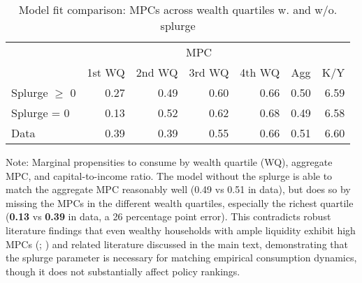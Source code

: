 \documentclass[\PathToRoot/\ProjectName]{subfiles}
\begin{document}
\begin{table}[tb] 
  \caption{Model fit comparison: MPCs across wealth quartiles w. and w/o. splurge}
  \whenintegrated{\label{tab:Comparison-Splurge-Table}} 
  \centering

  \begin{tabular*}
    {\textwidth}{@{\extracolsep{\fill}}lrrrrrr@{}} 
    \hline
    & \multicolumn{5}{c}{MPC} & \\
    & \multicolumn{1}{c}{1st WQ} & \multicolumn{1}{c}{2nd WQ} & \multicolumn{1}{c}{3rd WQ} & \multicolumn{1}{c}{4th WQ} & \multicolumn{1}{c}{Agg} & \multicolumn{1}{c}{K/Y} \\ \hline
    Splurge $\geq$ 0      & 0.27 & 0.49 & 0.60 & 0.66 & 0.50 & 6.59 \\
    Splurge = 0           & 0.13 & 0.52 & 0.62 & 0.68 & 0.49 & 6.58 \\
    \addlinespace
    Data                  & 0.39 & 0.39 & 0.55 & 0.66 & 0.51 & 6.60 \\
    \hline
  \end{tabular*}

  \noindent\parbox{\textwidth}{
    \medskip
    \footnotesize Note: Marginal propensities to consume by wealth quartile (WQ), aggregate MPC, and capital-to-income ratio. The model without the splurge is able to match the aggregate MPC reasonably well (0.49 vs 0.51 in data), but does so by missing the MPCs in the different wealth quartiles, especially the richest quartile (\textbf{0.13} vs \textbf{0.39} in data, a 26 percentage point error). This contradicts robust literature findings that even wealthy households with ample liquidity exhibit high MPCs (\cite{crawley2023MicroMacro}; \cite{graham2024mental}) and related literature discussed in the main text, demonstrating that the splurge parameter is necessary for matching empirical consumption dynamics, though it does not substantially affect policy rankings.
  }
\end{table}

\vspace{0.5em}

\smartbib
\end{document}
